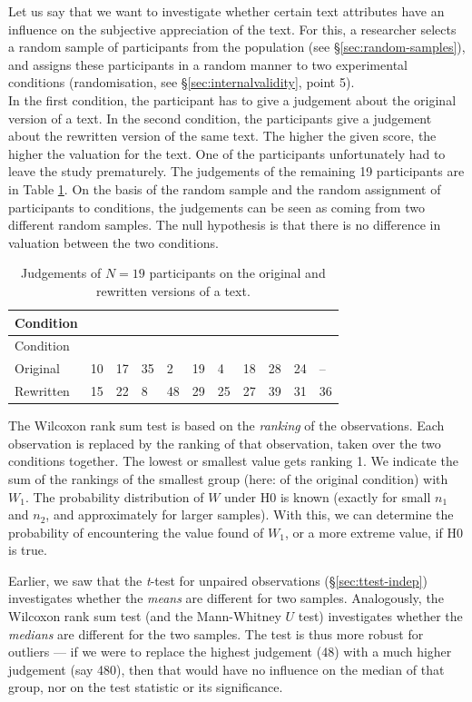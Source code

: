\documentclass[
]{book}
\begin{document}
Let us say that we want to investigate whether certain text attributes
have an influence on the subjective appreciation of the text. For this,
a researcher selects a random sample of participants
from the population (see
§\ref{sec:random-samples}), and assigns these participants in a random
manner to two experimental conditions (randomisation, see
§\ref{sec:internalvalidity}, point 5).\\
In the first condition, the participant has to give a judgement about
the original version of a text. In the second condition, the participants
give a judgement about the rewritten version of the same text.
The higher the given score, the higher the valuation for the text.
One of the participants unfortunately had to leave the study
prematurely. The judgements of the remaining 19 participants
are in Table \ref{tab:data-originalrewritten}. On the basis of the random
sample and the random assignment of participants to conditions,
the judgements can be seen as coming from two different
random samples. The null hypothesis is that there is no difference
in valuation between the two conditions.

\begin{longtable}[]{@{}lllllllllll@{}}
\caption{\label{tab:data-originalrewritten} Judgements of \(N=19\) participants on
the original and rewritten versions of a text.}\tabularnewline
\toprule
Condition & & & & & & & & & & \\
\midrule
\endfirsthead
\toprule
Condition & & & & & & & & & & \\
\midrule
\endhead
Original & 10 & 17 & 35 & 2 & 19 & 4 & 18 & 28 & 24 & -- \\
Rewritten & 15 & 22 & 8 & 48 & 29 & 25 & 27 & 39 & 31 & 36 \\
\bottomrule
\end{longtable}

The Wilcoxon rank sum test is based on the \emph{ranking} of the
observations. Each observation is replaced by the ranking of
that observation, taken over the two conditions together. The lowest or
smallest value gets ranking 1. We indicate the sum of the rankings of the
smallest group (here: of the original condition) with
\(W_1\). The probability distribution of \(W\) under H0 is known (exactly for small
\(n_1\) and \(n_2\), and approximately for larger samples). With this, we can
determine the probability of encountering the value found of \(W_1\),
or a more extreme value, if H0 is true.

Earlier, we saw that the \emph{t}-test for unpaired observations
(§\ref{sec:ttest-indep}) investigates whether the \emph{means}
are different for two samples. Analogously, the Wilcoxon
rank sum test (and the Mann-Whitney \(U\) test) investigates whether the
\emph{medians} are different for the two samples. The test is thus more
robust for outliers --- if we were to replace the highest judgement (48)
with a much higher judgement (say 480), then that would have no influence
on the median of that group, nor on the test statistic or its
significance.
\end{document}
